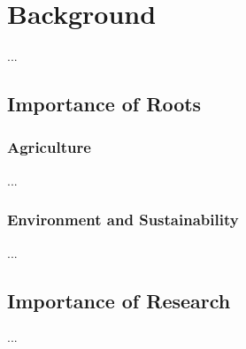 \section{Background}

...

\subsection{Importance of Roots}

\subsubsection{Agriculture}

...

\subsubsection{Environment and Sustainability}



...


\subsection{Importance of Research}

...







